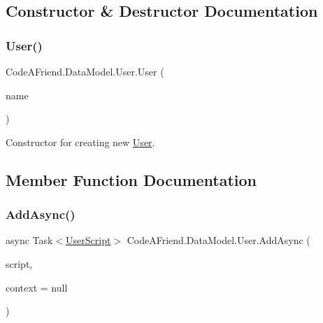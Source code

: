 \subsection{Constructor \& Destructor Documentation}
\mbox{\label{class_code_a_friend_1_1_data_model_1_1_user_a5604cc5f196cf59ac2b4b036d20b2227}} 
\subsubsection{\texorpdfstring{User()}{User()}}
{\footnotesize\ttfamily Code\+A\+Friend.\+Data\+Model.\+User.\+User (\begin{DoxyParamCaption}\item[{string}]{name }\end{DoxyParamCaption})}



Constructor for creating new \mbox{\hyperlink{class_code_a_friend_1_1_data_model_1_1_user}{User}}.



\subsection{Member Function Documentation}
\mbox{\label{class_code_a_friend_1_1_data_model_1_1_user_accaaafd48c85875b1d61622c4e58db05}} 
\subsubsection{\texorpdfstring{Add\+Async()}{AddAsync()}\hspace{0.1cm}{\footnotesize\ttfamily [1/2]}}
{\footnotesize\ttfamily async Task$<$\mbox{\hyperlink{class_code_a_friend_1_1_data_model_1_1_user_script}{User\+Script}}$>$ Code\+A\+Friend.\+Data\+Model.\+User.\+Add\+Async (\begin{DoxyParamCaption}\item[{\mbox{\hyperlink{class_code_a_friend_1_1_data_model_1_1_user_1_1_add_script_command}{Add\+Script\+Command}}}]{script,  }\item[{Db\+Context}]{context = {\ttfamily null} }\end{DoxyParamCaption})}



